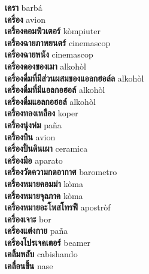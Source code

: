 \textbf{ เครา  } barbá \\
\textbf{ เครื่อง  } avion \\
\textbf{ เครื่องคอมพิวเตอร์  } kòmpiuter \\
\textbf{ เครื่องฉายภาพยนตร์  } cinemascop \\
\textbf{ เครื่องฉายหนัง  } cinemascop \\
\textbf{ เครื่องดองของเมา  } alkohòl \\
\textbf{ เครื่องดื่มที่มีส่วนผสมของแอลกฮอล์ล  } alkohòl \\
\textbf{ เครื่องดื่มที่มีแอลกอฮอล์  } alkohòl \\
\textbf{ เครื่องดื่มแอลกอฮอล์  } alkohòl \\
\textbf{ เครื่องทองเหลือง  } koper \\
\textbf{ เครื่องนุ่งห่ม  } paña \\
\textbf{ เครื่องบิน  } avion \\
\textbf{ เครื่องปั้นดินเผา  } ceramica \\
\textbf{ เครื่องมือ  } aparato \\
\textbf{ เครื่องวัดความกดอากาศ  } barometro \\
\textbf{ เครื่องหมายคอมม่า  } kòma \\
\textbf{ เครื่องหมายจุลภาค  } kòma \\
\textbf{ เครื่องหมายอะโพสโทรฟี  } apostròf \\
\textbf{ เครื่องเจาะ  } bor \\
\textbf{ เครื่องแต่งกาย  } paña \\
\textbf{ เครื่องโปรเจคเตอร์  } beamer \\
\textbf{ เคลิ้มหลับ  } cabishando \\
\textbf{ เคลื่อนขึ้น  } nase \\
